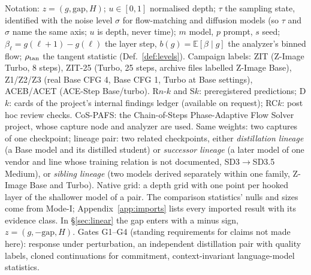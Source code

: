 \documentclass[11pt]{article}
\theoremstyle{definition}
\newcommand{\E}{\mathbb{E}}
\newcommand{\gap}{\mathrm{gap}}
\newcommand{\TT}{ZIT-25}%
\begin{document}
\begin{center}
{\begin{minipage}{0.94\linewidth}
Notation: $z=(g,\gap,H)$; $u\in[0,1]$ normalised depth; $\tau$ the sampling state, identified with the noise level $\sigma$ for flow-matching and diffusion models (so $\tau$ and $\sigma$ name the same axis; $u$ is depth, never time); $m$ model, $p$ prompt, $s$ seed; $\beta_\ell=g(\ell+1)-g(\ell)$ the layer step, $b(g)=\E[\beta\mid g]$ the analyzer's binned flow; $\rho_{\rm tan}$ the tangent statistic (Def.~\ref{def:levels}). Campaign labels: ZIT (Z-Image Turbo, 8 steps), \TT{} (Turbo, 25 steps, archive files labelled Z-Image Base), Z1/Z2/Z3 (real Base CFG 4, Base CFG 1, Turbo at Base settings), ACEB/ACET (ACE-Step Base/turbo). R$n$-$k$ and S$k$: preregistered predictions; D$k$: cards of the project's internal findings ledger (available on request); RC$k$: post hoc review checks. CoS-PAFS: the Chain-of-Steps Phase-Adaptive Flow Solver project, whose capture node and analyzer are used. Same weights: two captures of one checkpoint; lineage pair: two related checkpoints, either \emph{distillation lineage} (a Base model and its distilled student) or \emph{successor lineage} (a later model of one vendor and line whose training relation is not documented, SD3$\to$SD3.5 Medium), or \emph{sibling lineage} (two models derived separately within one family, Z-Image Base and Turbo). Native grid: a depth grid with one point per hooked layer of the shallower model of a pair. The comparison statistics' nulls and sizes come from Mode-I; Appendix~\ref{app:imports} lists every imported result with its evidence class. In \S\ref{sec:linear} the gap enters with a minus sign, $z=(g,-\gap,H)$. Gates G1--G4 (standing requirements for claims not made here): response under perturbation, an independent distillation pair with quality labels, cloned continuations for commitment, context-invariant language-model statistics.
\end{minipage}}
\end{center}
\end{document}
